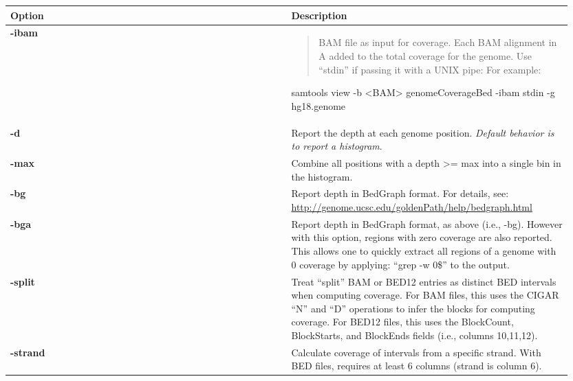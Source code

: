 \documentclass[letterpaper,10pt,english]{sphinxmanual}
\begin{document}
\begin{tabular}{|p{0.475\linewidth}|p{0.475\linewidth}|}
\hline
\textbf{
Option
} & \textbf{
Description
}\\\hline

\textbf{-ibam}
 & \begin{quote}

BAM file as input for coverage. Each BAM alignment in A added to the total coverage for the genome. Use ``stdin'' if passing it with a UNIX pipe: For example:
\end{quote}

\begin{DUlineblock}{0em}
\item[] samtools view -b \textless{}BAM\textgreater{} \textbar{} genomeCoverageBed -ibam stdin -g hg18.genome
\end{DUlineblock}
\\\hline

\textbf{-d}
 & 
Report the depth at each genome position. \emph{Default behavior is to report a histogram}.
\\\hline

\textbf{-max}
 & 
Combine all positions with a depth \textgreater{}= max into a single bin in the histogram.
\\\hline

\textbf{-bg}
 & 
Report depth in BedGraph format. For details, see: \href{http://genome.ucsc.edu/goldenPath/help/bedgraph.html}{http://genome.ucsc.edu/goldenPath/help/bedgraph.html}
\\\hline

\textbf{-bga}
 & 
Report depth in BedGraph format, as above (i.e., -bg). However with this option, regions with zero coverage are also reported. This allows one to quickly extract all regions of a genome with 0 coverage by applying: ``grep -w 0\$'' to the output.
\\\hline

\textbf{-split}
 & 
Treat ``split'' BAM or BED12 entries as distinct BED intervals when computing coverage. For BAM files, this uses the CIGAR ``N'' and ``D'' operations to infer the blocks for computing coverage. For BED12 files, this uses the BlockCount, BlockStarts, and BlockEnds fields (i.e., columns 10,11,12).
\\\hline

\textbf{-strand}
 & 
Calculate coverage of intervals from a specific strand. With BED files, requires at least 6 columns (strand is column 6).
\\\hline
\end{tabular}
\end{document}
